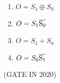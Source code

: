 \begin{enumerate}[label=\arabic*.,ref=\theenumi]
\begin{enumerate}
            \item  $O=S_1\oplus S_0$ 
            
            \item  $O=S_1\overline{\rm S_0}$
            
            \item  $O=S_1 + S_0$
            
            \item $O=S_0\overline{\rm S _1}$
 \end{enumerate}
    \hfill (GATE IN 2020)
%
\begin{figure}[H]
	\centering
	\resizebox{0.75\columnwidth}{!}{%

	}
\caption{}
\label{fig:figure13}
\end{figure}

\end{enumerate}


